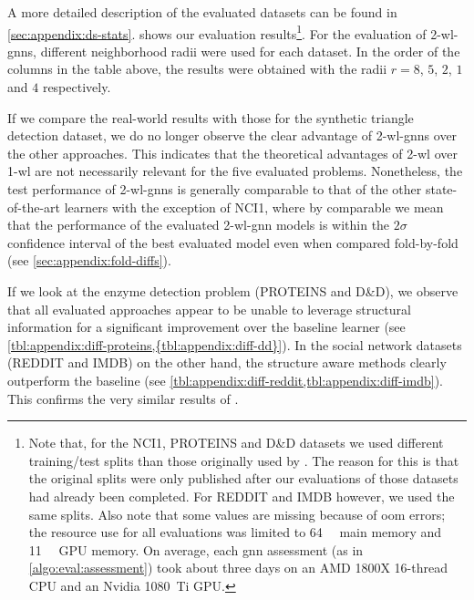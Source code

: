 A more detailed description of the evaluated datasets can be found in \cref{sec:appendix:ds-stats}.
 shows our evaluation results\footnote{
	Note that, for the NCI1, PROTEINS and D\&D datasets we used different training/test splits than those originally used by \citet{Errica2020}.
	The reason for this is that the original splits were only published after our evaluations of those datasets had already been completed.
	For REDDIT and IMDB however, we used the same splits.
	Also note that some values are missing because of \acf{oom} errors;
	the resource use for all evaluations was limited to \SI{64}{\giga\byte} main memory and \SI{11}{\giga\byte} GPU memory.
	On average, each \ac{gnn} assessment (as in \cref{algo:eval:assessment}) took about three days on an AMD 1800X 16-thread CPU and an Nvidia 1080~Ti GPU.%
}.
For the evaluation of 2-\acs{wl}-\acsp{gnn}, different neighborhood radii were used for each dataset.
In the order of the columns in the table above, the results were obtained with the radii $r = 8$, $5$, $2$, $1$ and $4$ respectively.

If we compare the real-world results with those for the synthetic triangle detection dataset, we do no longer observe the clear advantage of 2-\acs{wl}-\acsp{gnn} over the other approaches.
This indicates that the theoretical advantages of 2-\acs{wl} over 1-\acs{wl} are not necessarily relevant for the five evaluated problems.
Nonetheless, the test performance of 2-\acs{wl}-\acsp{gnn} is generally comparable to that of the other state-of-the-art learners with the exception of NCI1,
where by comparable we mean that the performance of the evaluated 2-\acs{wl}-\acs{gnn} models is within the $2\sigma$ confidence interval of the best evaluated model even when compared fold-by-fold (see \cref{sec:appendix:fold-diffs}).

If we look at the enzyme detection problem (PROTEINS and D\&D), we observe that all evaluated approaches appear to be unable to leverage structural information for a significant improvement over the baseline learner (see \cref{tbl:appendix:diff-proteins,{tbl:appendix:diff-dd}}).
In the social network datasets (REDDIT and IMDB) on the other hand, the structure aware methods clearly outperform the baseline (see \cref{tbl:appendix:diff-reddit,tbl:appendix:diff-imdb}).
This confirms the very similar results of \citet{Errica2020}.

